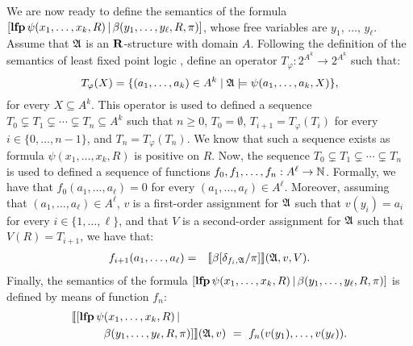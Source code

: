 We are now ready to define the semantics of the formula $[{\bf lfp} \, \psi(x_1,\ldots,x_k,R) \, | \, \beta(y_1,\ldots,y_{\ell},R,\pi)]$,  whose free variables are $y_1$, $\ldots$, $y_\ell$. Assume that $\mathfrak{A}$ is an $\mathbf{R}$-structure with domain $A$. Following the definition of the semantics of least fixed point logic \cite{I86,vardi1982complexity}, define an operator $T_{\varphi}:2^{A^k} \to 2^{A^k}$ such that:
$$
T_{\varphi}(X)  =  \{(a_1,\ldots,a_k) \in A^k \mid \mathfrak{A} \models \psi(a_1,\ldots,a_k,X) \},
$$
for every $X \subseteq A^k$. This operator is used to defined 
a sequence $T_0 \subsetneq T_1 \subsetneq \cdots \subsetneq T_n \subseteq A^k$  such that $n \geq 0$, $T_0 = \emptyset$, $T_{i+1} = T_{\varphi}(T_i)$ for every $i \in \{0, \ldots, n-1\}$, and $T_n = T_\varphi(T_n)$. We know that such a sequence exists as formula $\psi(x_1,\ldots,x_k,R)$ is positive on $R$. Now, the sequence $T_0 \subsetneq T_1 \subsetneq \cdots \subsetneq T_n$ is used to defined  a sequence of functions $f_0,f_1,\ldots,f_n:A^{\ell}\to\mathbb{N}$. Formally, we have that $f_0(a_1, \ldots, a_\ell) = 0$ for every $(a_1, \ldots, a_\ell) \in A^\ell$. Moreover, assuming that $(a_1, \ldots, a_\ell) \in A^\ell$, $v$ is a first-order assignment for $\mathfrak{A}$ such that $v(y_i) = a_i$ for every $i \in \{1, \ldots, \ell\}$, and that $V$ is a second-order assignment for $\mathfrak{A}$ such that $V(R) = T_{i+1}$, we have that:
\begin{eqnarray*}
f_{i+1}(a_1, \ldots, a_\ell) & = & {\llbracket{}{\beta[\delta_{f_i,\mathfrak{A}}/\pi]}\rrbracket}(\mathfrak{A},v,V).
\end{eqnarray*}
Finally, the semantics of the formula $[{\bf lfp} \, \psi(x_1,\ldots,x_k,R) \, | \, \beta(y_1,\ldots,y_{\ell},R,\pi)]$ is defined by means of function $f_n$:
\begin{align*}
&\llbracket [{\bf lfp} \, \psi(x_1,\ldots,x_k,R) \,|\\
&\hspace{10mm}\beta(y_1,\ldots,y_{\ell},R,\pi)]\rrbracket(\A,v) \ = \
f_n(v(y_1),\ldots,v(y_{\ell})).
\end{align*}

